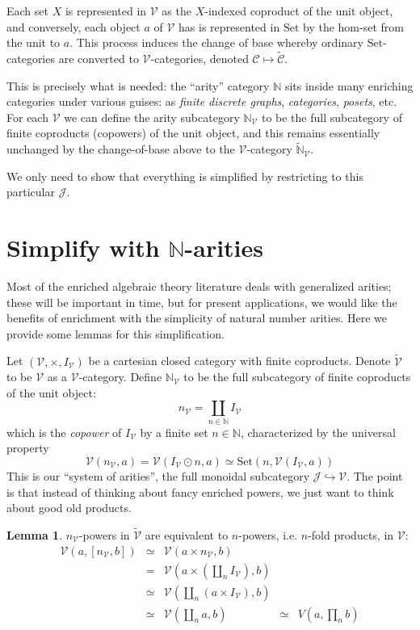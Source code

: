 \documentclass[a4paper,UKenglish]{article}
\theoremstyle{definition}
\newtheorem{lemma}[theorem]{Lemma}
\newcommand{\Set}{\mathrm{Set}}
\newcommand{\NN}{\mathbb{N}}
\newcommand{\V}{\mathscr{V}}
\newcommand{\C}{\mathscr{C}}
\newcommand{\J}{\mathscr{J}}
\begin{document}
Each set $X$ is represented in $\V$ as the $X$-indexed coproduct of the unit object, and conversely, each object $a$ of $\V$ has is represented in $\Set$ by the hom-set from the unit to $a$. This process induces the change of base whereby ordinary $\Set$-categories are converted to $\V$-categories, denoted $\C \mapsto \tilde{\C}$.

This is precisely what is needed: the ``arity'' category $\NN$ sits inside many enriching categories under various guises: as \textit{finite discrete graphs}, \textit{categories}, \textit{posets}, etc. For each $\V$ we can define the arity subcategory $\NN_\V$ to be the full subcategory of finite coproducts (copowers) of the unit object, and this remains essentially unchanged by the change-of-base above to the $\V$-category $\tilde{\NN}_\V$.

We only need to show that everything is simplified by restricting to this particular $\J$.

\section{Simplify with $\NN$-arities}

Most of the enriched algebraic theory literature deals with generalized arities; these will be important in time, but for present applications, we would like the benefits of enrichment with the simplicity of natural number arities. Here we provide some lemmas for this simplification.

Let $(\V,\times,I_\V)$ be a cartesian closed category with finite coproducts. Denote $\tilde{\V}$ to be $\V$ as a $\V$-category. Define $\NN_\V$ to be the full subcategory of finite coproducts of the unit object: $$n_\V = \coprod_{n \in \NN} I_\V$$ which is the \textit{copower} of $I_\V$ by a finite set $n \in \NN$, characterized by the universal property $$\V(n_\V,a) = \V(I_\V \odot n,a) \simeq \Set(n,\V(I_\V,a))$$ This is our ``system of arities'', the full monoidal subcategory $\J \hookrightarrow \V$. The point is that instead of thinking about fancy enriched powers, we just want to think about good old products.

\begin{lemma} $n_\V$-powers in $\tilde{\V}$ are equivalent to $n$-powers, i.e. $n$-fold products, in $\V$:
	\[\begin{array}{rclcl}
	\V(a,[n_\V,b]) & \simeq & \V(a\times n_\V,b) & &\\
	& = & \V(a\times (\coprod_n I_\V),b) & &\\
	& \simeq & \V(\coprod_n(a\times I_\V),b) & &\\
	& \simeq & \V(\coprod_n a,b) & \simeq & V(a,\prod_n b)\\
	\end{array}\]
\end{lemma}
\end{document}
